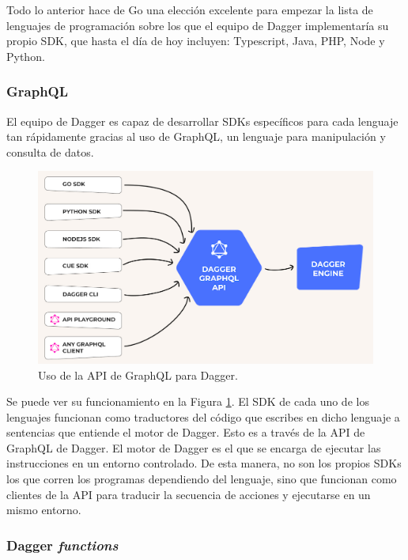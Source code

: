 Todo lo anterior hace de Go una elección excelente para empezar la lista de lenguajes de programación sobre los que el equipo de Dagger implementaría su propio SDK, que hasta el día de hoy incluyen: Typescript, Java, PHP, Node y Python. 

\subsubsection*{GraphQL}

El equipo de Dagger es capaz de desarrollar SDKs específicos para cada lenguaje tan rápidamente gracias al uso de GraphQL\cite{graphql}, un lenguaje para manipulación y consulta de datos.

\begin{figure}
  \centerline{\includegraphics[width=14cm]{figuras/graphql}}
  \caption{Uso de la API de GraphQL para Dagger.\cite{img:graphql}}
  \label{fig:graphql}
\end{figure}

Se puede ver su funcionamiento en la Figura \ref{fig:graphql}. El SDK de cada uno de los lenguajes funcionan como traductores del código que escribes en dicho lenguaje a sentencias que entiende el motor de Dagger. Esto es a través de la API de GraphQL de Dagger. El motor de Dagger es el que se encarga de ejecutar las instrucciones en un entorno controlado. De esta manera, no son los propios SDKs los que corren los programas dependiendo del lenguaje, sino que funcionan como clientes de la API para traducir la secuencia de acciones y ejecutarse en un mismo entorno.

\subsubsection*{Dagger \textit{functions}}

